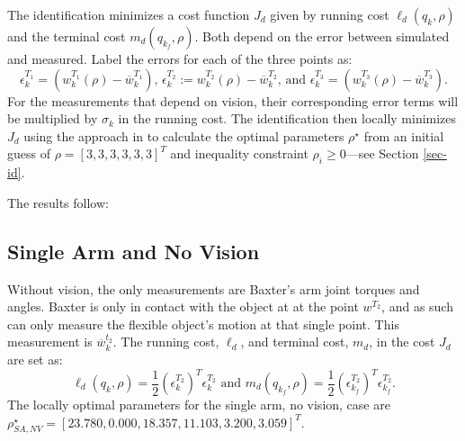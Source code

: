 \documentclass[runningheads,a4paper]{llncs}
\begin{document}
The identification minimizes a cost function $J_d$ given by running cost $\ell_d(q_k,\rho)$ and the terminal cost $m_d(q_{k_f},\rho)$. Both depend on the error between simulated and measured. Label the errors for each of the three points as:
\[
\epsilon^{T_1}_k = (w^{T_1}_k(\rho)-\overline{w}^{T_1}_k) \textrm{, } \epsilon^{T_2}_k := w^{T_2}_k(\rho)-\overline{w}^{T_2}_k \textrm{, and } \epsilon^{T_3}_k = (w^{T_3}_k(\rho)-\overline{w}^{T_3}_k).
\]
For the measurements that depend on vision, their corresponding error terms will be multiplied by $\sigma_k$ in the running cost. The identification then locally minimizes $J_d$ using the approach in \cite{caldwell_coleman_correll_iros} to calculate the optimal parameters $\rho^\star$ from an initial guess of $\rho = [3, 3, 3, 3, 3, 3]^T$ and inequality constraint $\rho_i\geq 0$---see Section \ref{sec-id}.

The results follow:

\subsection{Single Arm and No Vision \label{sec-no_vis}}
Without vision, the only measurements are Baxter's arm joint torques and angles.  Baxter is only in contact with the object at at the point $w^{T_2}$, and as such can only measure the flexible object's motion at that single point. This measurement is $\overline{w}_k^{t_2}$.  %
The running cost, $\ell_d$, and terminal cost, $m_d$, in the cost $J_d$ are set as:
\[
\ell_d(q_k,\rho) = \frac{1}{2}(\epsilon^{T_2}_k)^T\epsilon^{T_2}_k \textrm{ and } m_d(q_{k_f},\rho) = \frac{1}{2}(\epsilon^{T_2}_{k_f})^T\epsilon^{T_2}_{k_f}.
\]
The locally optimal parameters for the single arm, no vision, case are $\rho_{SA,NV}^\star = [23.780,  0.000 , 18.357 , 11.103 , 3.200,  3.059]^T$.
\end{document}
